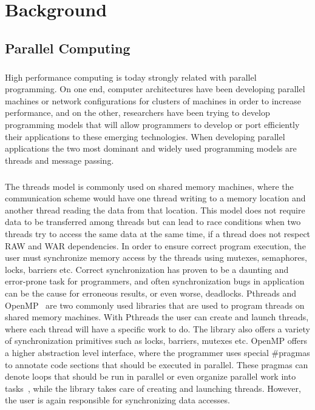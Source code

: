 \chapter{Background}
\label{chap:background}
\section{Parallel Computing}
\paragraph{}
	High performance computing is today strongly related with parallel programming.  On one end, computer
architectures have been developing parallel machines or network configurations for clusters of machines
in order to increase performance, and on the other, researchers have been trying to develop programming
models that will allow programmers to develop or port efficiently their applications to these emerging 
technologies.  When developing parallel applications the two most dominant and widely used programming 
models are threads and message passing.  

\paragraph{}
The threads model is commonly used on shared memory machines, where 
the communication scheme would have one thread writing to a memory location
and another thread reading the data from that location.  This model does not require data to be
transferred among threads but can lead to race conditions when two threads try to access the same
data at the same time, if a thread does not respect RAW and WAR dependencies. 
In order to ensure correct program execution,
the user must synchronize memory access by the threads using mutexes, semaphores, locks, barriers etc.
Correct synchronization has proven to be a daunting and error-prone task for programmers, and often 
synchronization bugs in application can be the cause for  
erroneous results, or even worse, deadlocks.  Pthreads and OpenMP~\cite{Dagum:1998:OIA:615255.615542}
 are two commonly used libraries
that are used to program threads on shared memory machines.  With Pthreads the user can create and
launch threads, where each thread will have a specific work to do.  The library also offers 
a variety of synchronization primitives such as locks, barriers, mutexes etc.  OpenMP offers
a higher abstraction level interface, where the programmer uses special \#pragmas to annotate
code sections that should be executed in parallel.  These pragmas can denote loops that should 
be run in parallel or even organize parallel work into tasks~\cite{Ayguade:2009:DOT:1512157.1512430},
while the library takes care of creating and launching threads.  However, the user is again responsible
for synchronizing data accesses.

